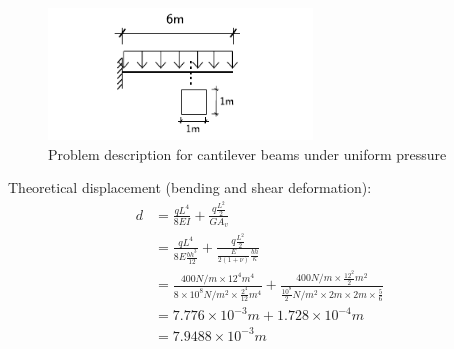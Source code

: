 \documentclass[fleqn,11pt]{article}
\begin{document}
\begin{figure}[H]
  \centering
  \includegraphics[width=7cm]{../Figure-files/cantilever_6_uniform_load.pdf}
  \caption{Problem description for cantilever beams under uniform pressure  }
  \label{fig Problem description for cantilever beams under uniform pressure 4}
\end{figure}


Theoretical displacement (bending and shear deformation):
\begin{equation}
  \begin{aligned}
  d &=\frac{qL^4}{8EI} + \frac{q \frac{L^2}{2}}{GA_v} \\ 
    &=\frac{qL^4}{8E\frac{bh^3}{12} }+\frac{q \frac{L^2}{2}}{\frac{E}{2(1+\nu)}\frac{bh}{\kappa}} \\
    &= \frac{400 N/m \times 12^4 m^4}{8\times 10^8 N/m^2 \times \frac{2^4}{12} m^4} 
       + \frac{400 N/m \times \frac{12^2}{2} m^2} {\frac{10^8}{2} N/m^2 \times 2m\times 2m\times \frac{5}{6}} \\ 
    &=7.776\times 10^{-3} m  +1.728\times 10^{-4}  m \\
    &=7.9488\times 10^{-3} m
   \end{aligned}
\end{equation}
\end{document}

